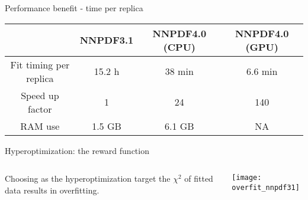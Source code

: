 \begin{frame}{Performance benefit - time per replica}
  \begin{table}
     \renewcommand{\arraystretch}{1.50}
    \centering
    \begin{tabular}{c | c | c | c} \toprule
      & NNPDF3.1  & NNPDF4.0 (CPU) & NNPDF4.0  (GPU) \\
            \midrule
      Fit timing per replica    & 15.2 h        & 38 min        & 6.6 min \\ \hline
             Speed up factor    & 1        &  24      & 140 \\ \hline
      RAM use &  1.5 GB          &  6.1 GB                 & NA  \\ \bottomrule
    \end{tabular}
  \end{table}
  \vspace*{1em}
\end{frame}

\begin{frame}[t]{Hyperoptimization: the reward function}
    \begin{columns}[T]
        \begin{column}{0.48\textwidth}
            \vspace{\topsep}
            Choosing as the hyperoptimization target the $\chi^2$ of fitted data results in overfitting.
        \end{column}
        \begin{column}{0.48\textwidth}
            \texttt{[image: overfit\_nnpdf31]}
        \end{column}
    \end{columns}
\end{frame}



